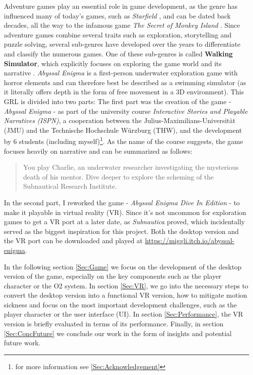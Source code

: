 \documentclass[letterpaper, 10 pt, conference]{ieeeconf}  %
\begin{document}
Adventure games play an essential role in game development, 
as the genre has influenced many of today's games, such as \textit{Starfield} \cite{starfield},
and can be dated back decades, all the way to the infamous game \textit{The Secret of Monkey Island} \cite{monkey}.
Since adventure games combine several traits such as exploration, storytelling and puzzle solving, several sub-genres have developed over the years to differentiate and classify the numerous games.
One of these sub-genres is called \textbf{Walking Simulator}, which explicitly focuses on exploring the game world and its narrative \cite{adventure}.
\textit{Abyssal Enigma} is a first-person underwater exploration game with horror elements and can therefore best be described as a swimming simulator 
(as it literally offers depth in the form of free movement in a 3D environment).
This GRL is divided into two parts:
The first part was the creation of the game - \textit{Abyssal Enigma} - as part of the university course \textit{Interactive Stories and Playable Narratives (ISPN)}, 
a cooperation between the Julius-Maximilians-Universität (JMU) and the Technische Hochschule Würzburg (THW),
and the development by 6 students (including myself)\footnote{for more information see \ref{Sec:Acknowledgement}}. 
As the name of the course suggests, the game focuses heavily on narrative and can be summarized as follows:

\begin{quote}
    You play Charlie, an underwater researcher investigating the mysterious death of his mentor.
    Dive deeper to explore the scheming of the Subnautical Research Institute.
\end{quote} 

In the second part, I  reworked the game - \textit{Abyssal Enigma Dive In Edition} - to make it playable in virtual reality (VR).
Since it's not uncommon for exploration games to get a VR port at a later date, as \textit{Subnautica} \cite{Subnautica} proved, 
which incidentally served as the biggest inspiration for this project.
Both the desktop version and the VR port can be downloaded and played at
\url{https://miggli.itch.io/abyssal-enigma}.

In the following section \ref{Sec:Game} we focus on the development of the desktop version of the game, 
especially on the key components such as the player character or the O2 system.
In section \ref{Sec:VR}, we go into the necessary steps to convert the desktop version into a functional VR version,
how to mitigate motion sickness 
and focus on the most important development challenges, such as the player character or the user interface (UI).
In section \ref{Sec:Performance}, the VR version is briefly evaluated in terms of its performance.
Finally, in section \ref{Sec:ConcFuture} we conclude our work in the form of insights and potential future work.
\end{document}

